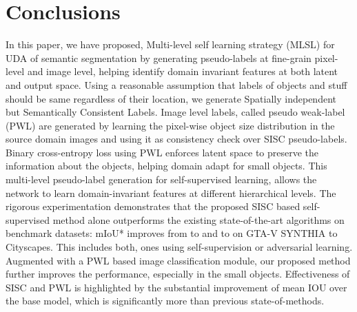 \documentclass[10pt,twocolumn,letterpaper]{article}
\begin{document}
\section{Conclusions}
\vspace{-0.2cm}
In this paper, we have proposed,  Multi-level self learning strategy (MLSL) for UDA of semantic segmentation by generating pseudo-labels at fine-grain pixel-level and image level, helping identify domain invariant features at both latent and output space.
Using a reasonable assumption that labels of objects and stuff should be same regardless of their location, we generate Spatially independent but Semantically Consistent Labels.
Image level labels, called pseudo weak-label (PWL)  are generated by learning the pixel-wise object size distribution in the source domain images and using it as consistency check over SISC pseudo-labels.
Binary cross-entropy loss using PWL enforces latent space to preserve the information about the objects, helping domain adapt for small objects. 
This multi-level pseudo-label generation for self-supervised learning, allows the network to learn domain-invariant features at different hierarchical levels. 
The rigorous experimentation demonstrates that the proposed SISC based self-supervised method alone outperforms the existing state-of-the-art algorithms on benchmark datasets: mIoU* improves from  to  and  to  on GTA-V  SYNTHIA to Cityscapes. This includes both,  ones using self-supervision or adversarial learning. 
Augmented with a PWL based image classification module, our proposed method further improves the performance, especially in the small objects. 
Effectiveness of SISC and PWL is highlighted by the substantial improvement of mean IOU over the base model, which is significantly more than previous state-of-methods.




{\small


}
\end{document}
